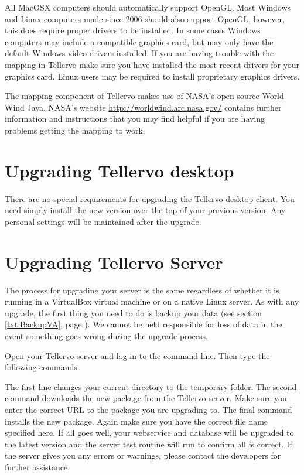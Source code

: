 All MacOSX computers should automatically support OpenGL.  Most Windows and Linux computers made since 2006 should also support OpenGL, however, this does require proper drivers to be installed. In some cases Windows computers may include a compatible graphics card, but may only have the default Windows video drivers installed.  If you are having trouble with the mapping in Tellervo make sure you have installed the most recent drivers for your graphics card.  Linux users may be required to install proprietary graphics drivers.  

The mapping component of Tellervo makes use of NASA's open source World Wind Java.  NASA's website \url{http://worldwind.arc.nasa.gov/} contains further information and instructions that you may find helpful if you are having problems getting the mapping to work.  


\section{Upgrading Tellervo desktop}

There are no special requirements for upgrading the Tellervo desktop client.  You need simply install the new version over the top of your previous version.  Any personal settings will be maintained after the upgrade.


\section{Upgrading Tellervo Server}

The process for upgrading your server is the same regardless of whether it is running in a VirtualBox virtual machine or on a native Linux server.  As with any upgrade, the first thing you need to do is backup your data (see section \ref{txt:BackupVA}, page \pageref{txt:BackupVA}).  We cannot be held responsible for loss of data in the event something goes wrong during the upgrade process.  

Open your Tellervo server and log in to the command line.  Then type the following commands:


The first line changes your current directory to the temporary folder.  The second command downloads the new package from the Tellervo server.  Make sure you enter the correct URL to the package you are upgrading to.  The final command installs the new package.  Again make sure you have the correct file name specified here. If all goes well, your webservice and database will be upgraded to the latest version and the server test routine will run to confirm all is correct.  If the server gives you any errors or warnings, please contact the developers for further assistance.

